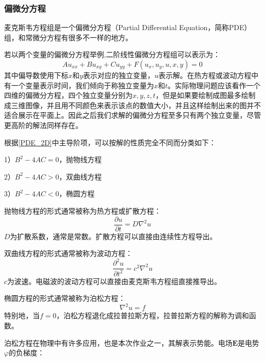 \documentclass[UTF8,a4paper,10pt]{ctexart}
\begin{document}
\begin{multicols}{2}
            \subsubsection{偏微分方程}
            麦克斯韦方程组是一个偏微分方程（Partial Differential Equation，简称PDE）组，和常微分方程有很多不一样的地方。\par
            若以两个变量的偏微分方程举例,二阶线性偏微分方程组可以表示为：
            \begin{equation}\label{PDE_2D}
                    Au_{xx} + Bu_{xy} + Cu_{yy} + F(u_x,u_y,u,x,y) = 0
            \end{equation}
            其中偏导数使用下标$x$和$y$表示对应的独立变量，$u$表示解。在热方程或波动方程中有一个变量表示时间，我们倾向于称独立变量为$x$和$t$。实际物理问题应该看作一个四维的偏微分方程，四个独立变量分别为$x,y,z,t$，但是如果要绘制成图最多绘制成三维图像，并且用不同颜色来表示该点的数值大小，并且这样绘制出来的图并不适合展示在平面上。因此之后我们求解的偏微分方程至多只有两个独立变量，尽管更高阶的解法同样存在。\par
            根据\eqref{PDE_2D}中主导阶项，可以按解的性质完全不同而分类如下：\par
            1）$B^2 - 4AC = 0$，抛物线方程\par
            2）$B^2 - 4AC > 0$，双曲线方程\par
            3）$B^2 - 4AC < 0$，椭圆方程\par
            抛物线方程的形式通常被称为热方程或扩散方程：
            \begin{equation}
                \frac{\partial u}{\partial t} = D\nabla^2 u
            \end{equation}
            $D$为扩散系数，通常是常数。扩散方程可以直接由连续性方程导出。\par
            双曲线方程的形式通常被称为波动方程：
            \begin{equation}
                \frac{\partial^2u}{\partial t^2} = c^2\nabla^2 u
            \end{equation}
            $c$为波速。电磁波的波动方程可以直接由麦克斯韦方程组直接推导出。\par
            椭圆方程的形式通常被称为泊松方程：
            \begin{equation}
                \nabla^2 u = f
            \end{equation}
            特别地，当$f=0$，泊松方程退化成拉普拉斯方程，拉普拉斯方程的解称为调和函数。\par
            泊松方程在物理中有许多应用，也是本次作业之一，其解表示势能。电场$\bm{E}$是电势$\varphi$的负梯度：

\end{multicols}
\end{document}
